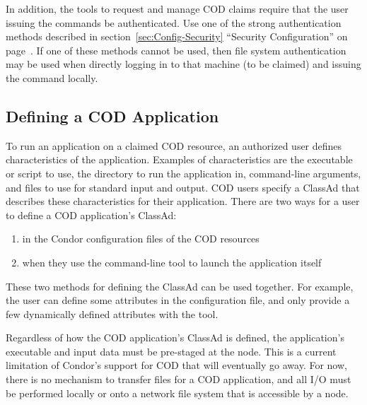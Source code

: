 In addition, the tools to request and manage COD claims
require that the user issuing the commands be authenticated. 
Use one of the strong authentication methods described
in section~\ref{sec:Config-Security} ``Security Configuration'' on
page~\pageref{sec:Config-Security}.
If one of these methods cannot be used,
then file system authentication may be used
when directly logging in to that machine (to be claimed)
and issuing the command locally.


\subsection{\label{sec:cod-setup}
Defining a COD Application}

To run an application on a claimed COD resource,
an authorized user defines 
characteristics of the application.
Examples of characteristics are the executable or script to use,
the directory to run the application in,
command-line arguments, and
files to use for standard input and output.
COD users specify a ClassAd that describes these characteristics
for their application.  
There are two ways for a user to define a COD application's ClassAd:

\begin{enumerate}
\item in the Condor configuration files of the COD resources
\item when they use the  command-line tool to launch the
application itself
\end{enumerate}

These two methods for defining the ClassAd can be used together.
For example, the user can define some attributes
in the configuration file, and only provide a few dynamically defined
attributes with the  tool.

Regardless of how the COD application's ClassAd is defined,
the application's executable and input
data must be pre-staged at the node.
This is a current limitation of Condor's support for COD that will
eventually go away.
For now, there is no mechanism to transfer files for a COD
application, and all I/O must be performed locally or onto a network
file system that is accessible by a node.

